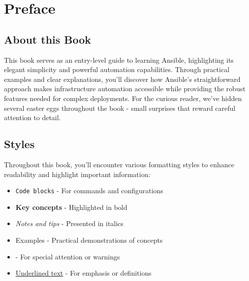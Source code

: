 \chapter*{Preface}

\section*{About this Book}

This book serves as an entry-level guide to learning Ansible, highlighting its elegant simplicity and powerful automation capabilities. Through practical examples and clear explanations, you'll discover how Ansible's straightforward approach makes infrastructure automation accessible while providing the robust features needed for complex deployments. For the curious reader, we've hidden several easter eggs throughout the book - small surprises that reward careful attention to detail.

\section*{Styles}

Throughout this book, you'll encounter various formatting styles to enhance readability and highlight important information:

\begin{itemize}[leftmargin=*,itemsep=0.1in] %
    \item \texttt{Code blocks} - For commands and configurations
    \item \textbf{Key concepts} - Highlighted in bold
    \item \textit{Notes and tips} - Presented in italics
    \item Examples - Practical demonstrations of concepts
    \item {} - For special attention or warnings
    \item \underline{Underlined text} - For emphasis or definitions
\end{itemize}

